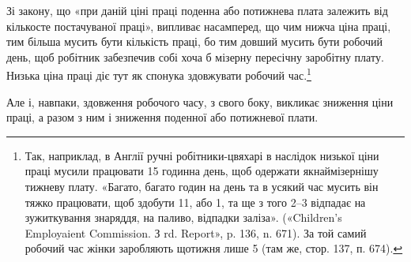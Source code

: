 Зі закону, що «при даній ціні праці поденна або потижнева
плата залежить від кількосте постачуваної праці», випливає
насамперед, що чим нижча ціна праці, тим більша мусить бути
кількість праці, бо тим довший мусить бути робочий день, щоб
робітник забезпечив собі хоча б мізерну пересічну заробітну плату.
Низька ціна праці діє тут як спонука здовжувати робочий час.\footnote{
Так, наприклад, в Англії ручні робітники-цвяхарі в наслідок
низької ціни праці мусили працювати 15 годинна день, щоб одержати якнаймізернішу
тижневу плату. «Багато, багато годин на день та в усякий
час мусить він тяжко працювати, щоб здобути 11, або 1,
та ще з того 2--3 відпадає на зужиткування знаряддя, на паливо,
відпадки заліза». («Children’s Employaient Commission. З rd. Report», p.
136, n. 671). За той самий робочий час жінки заробляють щотижня
лише 5 (там же, стор. 137, п. 674).
}

Але і, навпаки, здовження робочого часу, з свого боку, викликає
зниження ціни праці, а разом з ним і зниження поденної
або потижневої плати.

